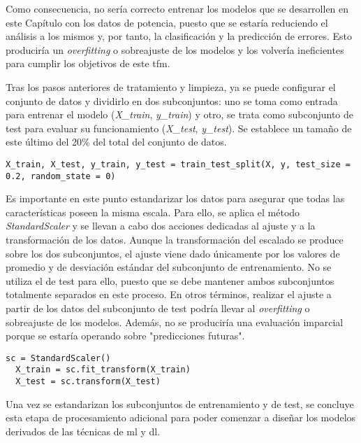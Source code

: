 \vspace{3mm}

Como consecuencia, no sería correcto entrenar los modelos que se desarrollen en este Capítulo con los datos de potencia, puesto que se estaría reduciendo el análisis a los mismos y, por tanto, la clasificación y la predicción de errores. Esto produciría un \textit{overfitting} o sobreajuste de los modelos y los volvería ineficientes para cumplir los objetivos de este \gls{tfm}.

\vspace{3mm}

Tras los pasos anteriores de tratamiento y limpieza, ya se puede configurar el conjunto de datos y dividirlo en dos subconjuntos: uno se toma como entrada para entrenar el modelo (\textit{X\_train}, \textit{y\_train}) y otro, se trata como subconjunto de test para evaluar su funcionamiento (\textit{X\_test}, \textit{y\_test}). Se establece un tamaño de este último del 20\% del total del conjunto de datos.

\vspace{3mm}

\begin{lstlisting}[style=Python, caption={Codificación de los datos categóricos}]
  X_train, X_test, y_train, y_test = train_test_split(X, y, test_size = 0.2, random_state = 0)
\end{lstlisting}

\pagebreak

Es importante en este punto estandarizar los datos para asegurar que todas las características poseen la misma escala. Para ello, se aplica el método \textit{StandardScaler} y se llevan a cabo dos acciones dedicadas al ajuste y a la transformación de los datos. Aunque la transformación del escalado se produce sobre los dos subconjuntos, el ajuste viene dado únicamente por los valores de promedio y de desviación estándar del subconjunto de entrenamiento. No se utiliza el de test para ello, puesto que se debe mantener ambos subconjuntos totalmente separados en este proceso. En otros términos, realizar el ajuste a partir de los datos del subconjunto de test podría llevar al \textit{overfitting} o sobreajuste de los modelos. Además, no se produciría una evaluación imparcial porque se estaría operando sobre "predicciones futuras".

\vspace{3mm}

\begin{lstlisting}[style=Python, caption={Estandarización de los subconjuntos}]
  sc = StandardScaler() 
  X_train = sc.fit_transform(X_train)
  X_test = sc.transform(X_test)
\end{lstlisting}

\vspace{3mm}

Una vez se estandarizan los subconjuntos de entrenamiento y de test, se concluye esta etapa de procesamiento adicional para poder comenzar a diseñar los modelos derivados de las técnicas de \gls{ml} y \gls{dl}.